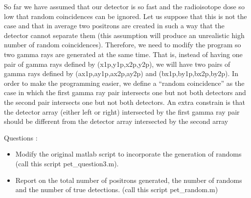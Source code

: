 \documentclass[12pt]{article} %
\newcounter{ejercicioNo}
\begin{document}
So far we have assumed that our detector is so fast and the radioisotope dose so low that random coincidences can be ignored. Let us suppose that this is not the case and that in average two positrons are created in such a way that the detector cannot separate them (this assumption will produce  an unrealistic high number of random coincidences). Therefore, we need to modify the program so two gamma rays are generated at the same time. That is,  instead of having one pair of gamma rays defined by (x1p,y1p,x2p,y2p), we will have two pairs of gamma rays defined by (ax1p,ay1p,ax2p,ay2p) and (bx1p,by1p,bx2p,by2p). In order to make the programming easier, we define a ``random coincidence'' as the case in which the first gamma ray pair intersects one but not both detectors and the second pair intersects one but not both detectors. An extra constrain is that the detector array (either left or right) intersected by the first gamma ray pair should be different from the detector array intersected by the second array   

\begin{minipage}{\linewidth}
\begin{framed}
\addtocounter{ejercicioNo}{1} 
Questions : 
\begin{itemize}
   \item Modify the original matlab script to incorporate the generation of randoms (call this script pet\_question3.m).
   \item Report on the total number of positrons generated, the number of randoms and the number of true detections. (call this script pet\_random.m)
\end{itemize}
\end{framed}
\end{minipage}



\end{document}
